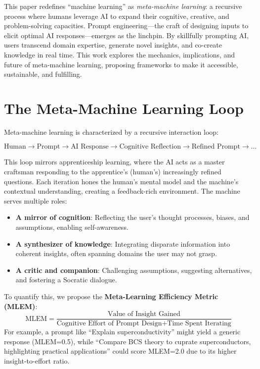 \documentclass{article}
\begin{document}
This paper redefines ``machine learning'' as \emph{meta-machine learning}: a recursive process where humans leverage AI to expand their cognitive, creative, and problem-solving capacities. Prompt engineering---the craft of designing inputs to elicit optimal AI responses---emerges as the linchpin. By skillfully prompting AI, users transcend domain expertise, generate novel insights, and co-create knowledge in real time. This work explores the mechanics, implications, and future of meta-machine learning, proposing frameworks to make it accessible, sustainable, and fulfilling.

\section{The Meta-Machine Learning Loop}
Meta-machine learning is characterized by a recursive interaction loop:

\[ \text{Human} \to \text{Prompt} \to \text{AI Response} \to \text{Cognitive Reflection} \to \text{Refined Prompt} \to \dots \]

This loop mirrors apprenticeship learning, where the AI acts as a master craftsman responding to the apprentice's (human's) increasingly refined questions. Each iteration hones the human’s mental model and the machine’s contextual understanding, creating a feedback-rich environment. The machine serves multiple roles:
\begin{itemize}
    \item \textbf{A mirror of cognition}: Reflecting the user’s thought processes, biases, and assumptions, enabling self-awareness.
    \item \textbf{A synthesizer of knowledge}: Integrating disparate information into coherent insights, often spanning domains the user may not grasp.
    \item \textbf{A critic and companion}: Challenging assumptions, suggesting alternatives, and fostering a Socratic dialogue.
\end{itemize}

To quantify this, we propose the \textbf{Meta-Learning Efficiency Metric (MLEM)}:
\[ \text{MLEM} = \frac{\text{Value of Insight Gained}}{\text{Cognitive Effort of Prompt Design} + \text{Time Spent Iterating}} \]
For example, a prompt like ``Explain superconductivity'' might yield a generic response (MLEM=0.5), while ``Compare BCS theory to cuprate superconductors, highlighting practical applications'' could score MLEM=2.0 due to its higher insight-to-effort ratio.
\end{document}
